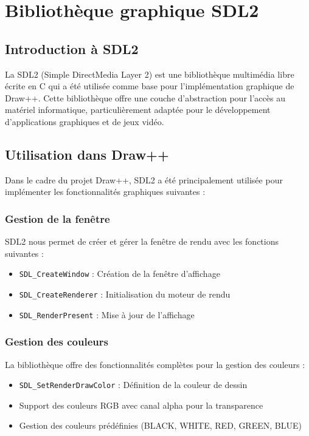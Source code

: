 \documentclass[12pt,a4paper]{report}
\begin{document}
\chapter{Bibliothèque graphique SDL2}

\section{Introduction à SDL2}
La SDL2 (Simple DirectMedia Layer 2) est une bibliothèque multimédia libre écrite en C qui a été utilisée comme base pour l'implémentation graphique de Draw++. Cette bibliothèque offre une couche d'abstraction pour l'accès au matériel informatique, particulièrement adaptée pour le développement d'applications graphiques et de jeux vidéo.

\section{Utilisation dans Draw++}
Dans le cadre du projet Draw++, SDL2 a été principalement utilisée pour implémenter les fonctionnalités graphiques suivantes :

\subsection{Gestion de la fenêtre}
SDL2 nous permet de créer et gérer la fenêtre de rendu avec les fonctions suivantes :
\begin{itemize}
    \item \texttt{SDL\_CreateWindow} : Création de la fenêtre d'affichage
    \item \texttt{SDL\_CreateRenderer} : Initialisation du moteur de rendu
    \item \texttt{SDL\_RenderPresent} : Mise à jour de l'affichage
\end{itemize}

\subsection{Gestion des couleurs}
La bibliothèque offre des fonctionnalités complètes pour la gestion des couleurs :
\begin{itemize}
    \item \texttt{SDL\_SetRenderDrawColor} : Définition de la couleur de dessin
    \item Support des couleurs RGB avec canal alpha pour la transparence
    \item Gestion des couleurs prédéfinies (BLACK, WHITE, RED, GREEN, BLUE)
\end{itemize}
\end{document}
